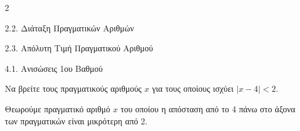 \begin{ylh}{2}
    \item 2.2. Διάταξη Πραγματικών Αριθμών
    \item 2.3. Απόλυτη Τιμή Πραγματικού Αριθμού
    \item 4.1. Ανισώσεις 1ου Βαθμού
\end{ylh}

\begin{alist}
\item Να βρείτε τους πραγματικούς αριθμούς $x$ για τους οποίους ισχύει $|x - 4| < 2$. 
\item Θεωρούμε πραγματικό αριθμό $x$ του οποίου η απόσταση από το 4 πάνω στο άξονα των πραγματικών είναι μικρότερη από 2.

\end{alist}

